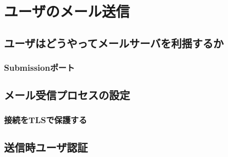 \chapter{ユーザのメール送信}

\section{ユーザはどうやってメールサーバを利揺するか}

\subsection{Submissionポート}

\section{メール受信プロセスの設定}

\subsection{接続をTLSで保護する}

\section{送信時ユーザ認証}